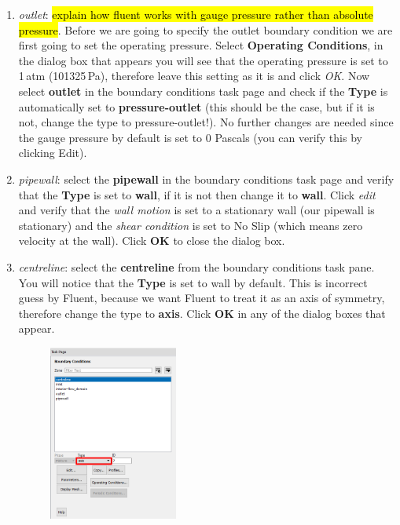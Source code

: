 \documentclass[11pt,a4paper,oneside,hidelinks]{scrartcl}
\newcommand\bfr[1]{\textcolor[rgb]{1,0.00,0.00}{\textbf{\textsf{#1}}}}
\begin{document}
\begin{enumerate}
\item \emph{outlet}: \hl{explain how fluent works with gauge pressure rather than absolute pressure}. Before we are going to specify the outlet boundary condition we are first going to set the operating pressure. Select \bfr{Operating Conditions}, in the dialog box that appears you will see that the operating pressure is set to 1\,atm (101325\,Pa), therefore leave this setting as it is and click \emph{OK}. Now select \bfr{outlet} in the boundary conditions task page and check if the \bfr{Type} is automatically set to \bfr{pressure-outlet} (this should be the case, but if it is not, change the type to pressure-outlet!). No further changes are needed since the gauge pressure by default is set to 0 Pascals (you can verify this by clicking Edit).
\item \emph{pipewall}: select the \bfr{pipewall} in the boundary conditions task page and verify that the \bfr{Type} is set to \bfr{wall}, if it is not then change it to \bfr{wall}. Click \emph{edit} and verify that the \emph{wall motion} is set to a stationary wall (our pipewall is stationary) and the \emph{shear condition} is set to No Slip (which means zero velocity at the wall). Click \bfr{OK} to close the dialog box.
\item \emph{centreline}: select the \bfr{centreline} from the boundary conditions task pane. You will notice that the \bfr{Type} is set to wall by default. This is incorrect guess by Fluent, because we want Fluent to treat it as an axis of symmetry, therefore change the type to \bfr{axis}. Click \bfr{OK} in any of the dialog boxes that appear.
    \begin{figure}[H]
    \begin{center}
    \includegraphics[width=0.4\textwidth,clip]{BC_centreline.png}
    \end{center}
    \end{figure}
\end{enumerate}
\end{document}
